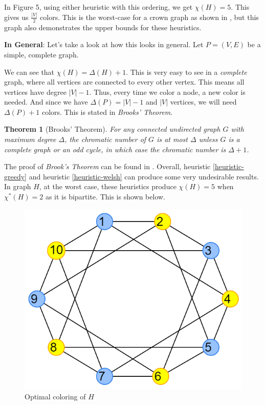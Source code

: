 \documentclass{article}
\newcounter{heuristic} \setcounter{heuristic}{0}
\newtheorem{theorem}{Theorem}
\theoremstyle{definition}
\begin{document}
In Figure 5, using either heuristic with this ordering, we get \(\chi(H) = 5\). This gives us \(\frac{|V|}{2}\) colors. This is the worst-case for a crown graph as shown in \cite{johnson}, but this graph also demonstrates the upper bounds for these heuristics. \newline

\textbf{In General}: Let's take a look at how this looks in general. Let \(P = (V, E)\) be a simple, complete graph. \newline

We can see that \(\chi(H) = \Delta(H) + 1\). This is very easy to see in a \emph{complete} graph, where all vertices are connected to every other vertex. This means all vertices have degree \(|V| - 1\). Thus, every time we color a node, a new color is needed. And since we have \(\Delta(P) = |V| - 1\) and \(|V|\) vertices, we will need \(\Delta(P) + 1\) colors. This is stated in \emph{Brooks' Theorem}.

\begin{theorem}[Brooks' Theorem]
For any connected undirected graph \(G\) with maximum degree \(\Delta\), the chromatic number of \(G\) is at most \(\Delta\) unless \(G\) is a complete graph or an odd cycle, in which case the chromatic number is \(\Delta + 1\).
\end{theorem}

The proof of \emph{Brook's Theorem} can be found in \cite{lovasz}. Overall, heuristic \ref{heuristic-greedy} and heuristic \ref{heuristic-welsh} can produce some very undesirable results. In graph \(H\), at the worst case, these heuristics produce \(\chi(H) = 5\) when \(\chi^{*}(H) = 2\) as it is bipartite. This is shown below.

\begin{figure}[H]
\centering
\includegraphics[scale=0.38]{images/graph-6.png}
\caption{Optimal coloring of \(H\)}
\end{figure}
\end{document}
